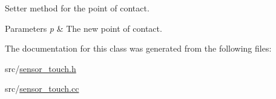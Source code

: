 Setter method for the point of contact. 


\begin{DoxyParams}{Parameters}
{\em p} & The new point of contact. \\
\hline
\end{DoxyParams}


The documentation for this class was generated from the following files\+:\begin{DoxyCompactItemize}
\item 
src/\hyperlink{sensor__touch_8h}{sensor\+\_\+touch.\+h}\item 
src/\hyperlink{sensor__touch_8cc}{sensor\+\_\+touch.\+cc}\end{DoxyCompactItemize}
